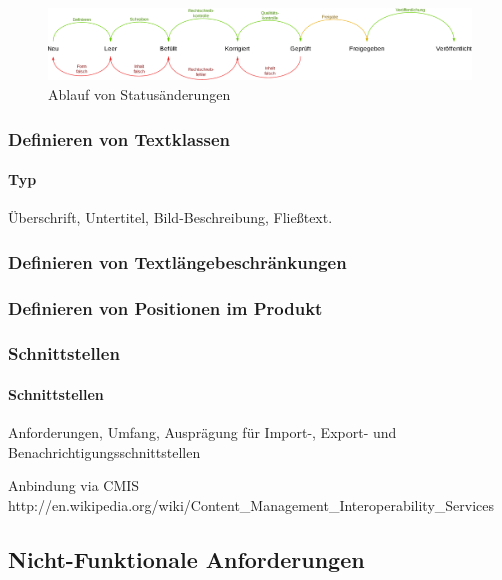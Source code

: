 \begin{figure}[htb]
\begin{center}
\includegraphics[width=\textwidth]{media/stati-mit-workflow.pdf}
\end{center}
\caption{Ablauf von Statusänderungen}
\label{chart:statimitworkflow}
\end{figure}

\subsubsection{Definieren von Textklassen}

\paragraph{Typ} Überschrift, Untertitel, Bild-Beschreibung, Fließtext.

\subsubsection{Definieren von Textlängebeschränkungen}

\subsubsection{Definieren von Positionen im Produkt}

\subsubsection{Schnittstellen}

\paragraph{Schnittstellen}

Anforderungen, Umfang, Ausprägung für Import-, Export- und Benachrichtigungsschnittstellen

Anbindung via CMIS http://en.wikipedia.org/wiki/Content\_Management\_Interoperability\_Services

\subsection{Nicht-Funktionale Anforderungen}\label{l:nicht-funktionale-anforderungen}

